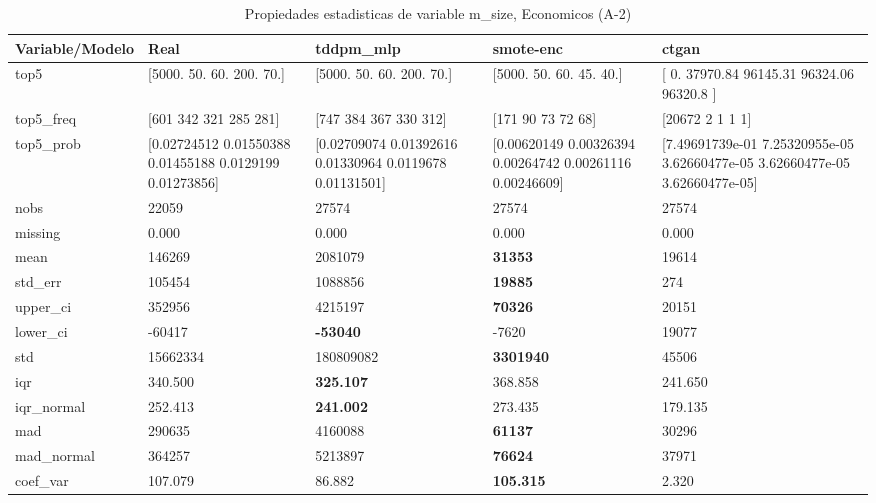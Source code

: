 \begin{table}[H]
\centering
\fontsize{8}{14}\selectfont
\caption{Propiedades  estadisticas de variable m\_size, Economicos (A-2)}
\label{table-stats-economicos-a-2-m_size}
\begin{tabular}{|l|m{10em}|m{10em}|m{10em}|m{10em}|}
\hline
 \rowcolor[gray]{0.8}
Variable/Modelo & Real & tddpm\_mlp & smote-enc & ctgan \\
\hline top5 & [5000.   50.   60.  200.   70.] & [5000.   50.   60.  200.   70.] & [5000.   50.   60.   45.   40.] & [    0.   37970.84 96145.31 96324.06 96320.8 ] \\
\hline top5\_freq & [601 342 321 285 281] & [747 384 367 330 312] & [171  90  73  72  68] & [20672     2     1     1     1] \\
\hline top5\_prob & [0.02724512 0.01550388 0.01455188 0.0129199  0.01273856] & [0.02709074 0.01392616 0.01330964 0.0119678  0.01131501] & [0.00620149 0.00326394 0.00264742 0.00261116 0.00246609] & [7.49691739e-01 7.25320955e-05 3.62660477e-05 3.62660477e-05
 3.62660477e-05] \\
\hline nobs & 22059 & 27574 & 27574 & 27574 \\
\hline missing & 0.000 & 0.000 & 0.000 & 0.000 \\
\hline mean & 146269 & \cellcolor[rgb]{0.9, 0.54, 0.52} 2081079 & \bfseries 31353 & 19614 \\
\hline std\_err & 105454 & \cellcolor[rgb]{0.9, 0.54, 0.52} 1088856 & \bfseries 19885 & 274 \\
\hline upper\_ci & 352956 & \cellcolor[rgb]{0.9, 0.54, 0.52} 4215197 & \bfseries 70326 & 20151 \\
\hline lower\_ci & -60417 & \bfseries -53040 & -7620 & \cellcolor[rgb]{0.9, 0.54, 0.52} 19077 \\
\hline std & 15662334 & \cellcolor[rgb]{0.9, 0.54, 0.52} 180809082 & \bfseries 3301940 & 45506 \\
\hline iqr & 340.500 & \bfseries 325.107 & 368.858 & \cellcolor[rgb]{0.9, 0.54, 0.52} 241.650 \\
\hline iqr\_normal & 252.413 & \bfseries 241.002 & 273.435 & \cellcolor[rgb]{0.9, 0.54, 0.52} 179.135 \\
\hline mad & 290635 & \cellcolor[rgb]{0.9, 0.54, 0.52} 4160088 & \bfseries 61137 & 30296 \\
\hline mad\_normal & 364257 & \cellcolor[rgb]{0.9, 0.54, 0.52} 5213897 & \bfseries 76624 & 37971 \\
\hline coef\_var & 107.079 & 86.882 & \bfseries 105.315 & \cellcolor[rgb]{0.9, 0.54, 0.52} 2.320 \\

\end{tabular}
\end{table}
